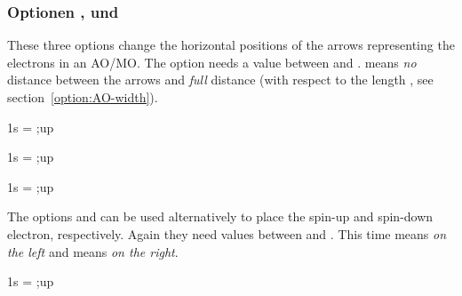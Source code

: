 \documentclass[load-preamble+]{cnltx-doc}
\begin{document}
\subsubsection{Optionen ,  und
  }
\label{option:electrons}

These three options change the horizontal positions of the arrows representing
the electrons in an \ac{AO}/\ac{MO}. The option  needs a
value between  and .  means \emph{no} distance between
the arrows and  \emph{full} distance (with respect to the length
, see section~\ref{option:AO-width}).

\begin{example}
  \begin{modiagram}[el-sep=.2]%
     { 1s = {;up} }
  \end{modiagram}
\end{example}

\begin{example}
  \begin{modiagram}[el-sep=0]
     { 1s = {;up} }
  \end{modiagram}
\end{example}

\begin{example}
   \begin{modiagram}[el-sep=1]
     { 1s = {;up} }
  \end{modiagram}
\end{example}

The options  and  can be used
alternatively to place the spin-up and spin-down electron, respectively.
Again they need values between  and .  This time 
means \emph{on the left} and  means \emph{on the right}.

\begin{example}
  \begin{modiagram}[up-el-pos=.4,down-el-pos=.6]%
     { 1s = {;up} }
  \end{modiagram}
\end{example}
\end{document}
